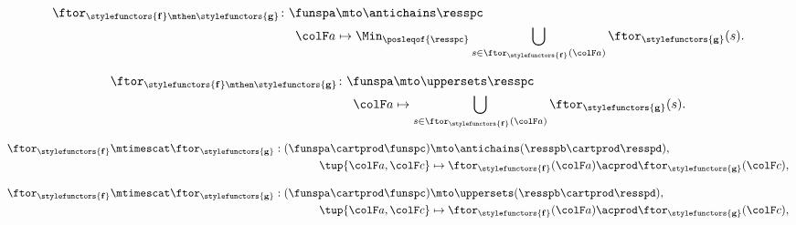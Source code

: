 \begin{forslides}
    \begin{equation}
        \label{eq:h_example_berk_series}
        \begin{aligned}
            {\displaystyle \ftor_{\stylefunctors{\mathbf{f}}\mthen \stylefunctors{\mathbf{g}}}\colon\funspa}
                                          & \mto\antichains \resspc \\
            \ensuremath{{\colF a}}\xspace & \mapsto\Min_{\posleqof{\resspc}}\bigcup_{s\in\ftor_{\stylefunctors{\mathbf{f}}}(\ensuremath{{\colF a}}\xspace)}\ftor_{\stylefunctors{\mathbf{g}}}(s).
        \end{aligned}
    \end{equation}

    \begin{equation}
        \label{eq:h_example_berk_series_u}
        \begin{aligned}
            {\displaystyle \ftor_{\stylefunctors{\mathbf{f}}\mthen \stylefunctors{\mathbf{g}}}\colon\funspa}
                                          & \mto\uppersets \resspc \\
            \ensuremath{{\colF a}}\xspace & \mapsto\bigcup_{s\in\ftor_{\stylefunctors{\mathbf{f}}}(\ensuremath{{\colF a}}\xspace)}\ftor_{\stylefunctors{\mathbf{g}}}(s).
        \end{aligned}
    \end{equation}

    \begin{equation}
        \label{eq:h_example_berk_par}
        \begin{aligned}
            \ftor_{\stylefunctors{\mathbf{f}}}\mtimescat\ftor_{\stylefunctors{\mathbf{g}}}:(\funspa \cartprod\funspc) & \mto\antichains(\resspb \cartprod\resspd), \\
            \tup{\ensuremath{{\colF a}}\xspace,\ensuremath{{\colF c}}\xspace}                                         & \mapsto\ftor_{\stylefunctors{\mathbf{f}}}(\ensuremath{{\colF a}}\xspace)\acprod\ftor_{\stylefunctors{\mathbf{g}}}(\ensuremath{{\colF c}}\xspace),\nonumber
        \end{aligned}
    \end{equation}

    \begin{equation}
        \label{eq:h_example_berk_par_u}
        \begin{aligned}
            \ftor_{\stylefunctors{\mathbf{f}}}\mtimescat\ftor_{\stylefunctors{\mathbf{g}}}:(\funspa \cartprod\funspc) & \mto\uppersets(\resspb \cartprod\resspd), \\
            \tup{\ensuremath{{\colF a}}\xspace,\ensuremath{{\colF c}}\xspace}                                         & \mapsto\ftor_{\stylefunctors{\mathbf{f}}}(\ensuremath{{\colF a}}\xspace)\acprod\ftor_{\stylefunctors{\mathbf{g}}}(\ensuremath{{\colF c}}\xspace),\nonumber
        \end{aligned}
    \end{equation}


\end{forslides}
